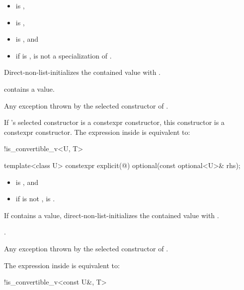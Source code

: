 \begin{itemdescr}
\pnum
\constraints
\begin{itemize}
\item {} is ,
\item {} is ,
\item {} is , and
\item if  is \cv{} ,
 is not a specialization of .
\end{itemize}

\pnum
\effects
Direct-non-list-initializes the contained value with .

\pnum
\ensures
{} contains a value.

\pnum
\throws
Any exception thrown by the selected constructor of .

\pnum
\remarks
If 's selected constructor is a constexpr constructor,
this constructor is a constexpr constructor.
The expression inside  is equivalent to:
\begin{codeblock}
!is_convertible_v<U, T>
\end{codeblock}
\end{itemdescr}

%
\begin{itemdecl}
template<class U> constexpr explicit(@\seebelow@) optional(const optional<U>& rhs);
\end{itemdecl}

\begin{itemdescr}
\pnum
\constraints
\begin{itemize}
\item {} is , and
\item if  is not \cv{} ,
 is .
\end{itemize}

\pnum
\effects
If  contains a value,
direct-non-list-initializes the contained value with .

\pnum
\ensures
{}.

\pnum
\throws
Any exception thrown by the selected constructor of .

\pnum
\remarks
The expression inside  is equivalent to:
\begin{codeblock}
!is_convertible_v<const U&, T>
\end{codeblock}
\end{itemdescr}

